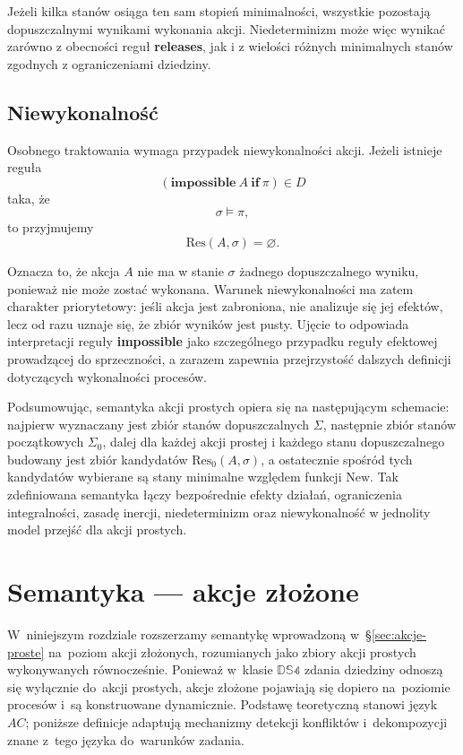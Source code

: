 \documentclass[11pt,a4paper]{article}
\newif\ifshowbib
\newcommand{\bibonly}[1]{\ifshowbib#1\fi}
\renewcommand{\cite}[2][]{\unskip}%
\theoremstyle{definition}
\begin{document}
Jeżeli kilka stanów osiąga ten sam stopień minimalności, wszystkie pozostają dopuszczalnymi wynikami wykonania akcji. Niedeterminizm może więc wynikać zarówno z obecności reguł \textbf{releases}, jak i z wielości różnych minimalnych stanów zgodnych z ograniczeniami dziedziny.

\subsection{Niewykonalność}
\label{sec:niewykonalnosc}

Osobnego traktowania wymaga przypadek niewykonalności akcji. Jeżeli istnieje reguła
\[
(\textbf{impossible}\ A\ \textbf{if}\ \pi)\in D
\]
taka, że
\[
\sigma \models \pi,
\]
to przyjmujemy
\[
\mathrm{Res}(A,\sigma)=\varnothing.
\]

Oznacza to, że akcja $A$ nie ma w stanie $\sigma$ żadnego dopuszczalnego wyniku, ponieważ nie może zostać wykonana. Warunek niewykonalności ma zatem charakter priorytetowy: jeśli akcja jest zabroniona, nie analizuje się jej efektów, lecz od razu uznaje się, że zbiór wyników jest pusty. Ujęcie to odpowiada interpretacji reguły \textbf{impossible} jako szczególnego przypadku reguły efektowej prowadzącej do sprzeczności, a zarazem zapewnia przejrzystość dalszych definicji dotyczących wykonalności procesów.

Podsumowując, semantyka akcji prostych opiera się na następującym schemacie: najpierw wyznaczany jest zbiór stanów dopuszczalnych $\Sigma$, następnie zbiór stanów początkowych $\Sigma_0$, dalej dla każdej akcji prostej i każdego stanu dopuszczalnego budowany jest zbiór kandydatów $\mathrm{Res}_0(A,\sigma)$, a ostatecznie spośród tych kandydatów wybierane są stany minimalne względem funkcji $\mathrm{New}$. Tak zdefiniowana semantyka łączy bezpośrednie efekty działań, ograniczenia integralności, zasadę inercji, niedeterminizm oraz niewykonalność w jednolity model przejść dla akcji prostych.

\section{Semantyka --- akcje złożone}
\label{sec:akcje-zlozone}

W~niniejszym rozdziale rozszerzamy semantykę wprowadzoną w~§\ref{sec:akcje-proste} na~poziom
akcji złożonych, rozumianych jako zbiory akcji prostych wykonywanych
równocześnie. Ponieważ w~klasie $\mathbb{DS4}$ zdania dziedziny
odnoszą się wyłącznie do~akcji prostych, akcje złożone pojawiają się
dopiero na~poziomie procesów i~są konstruowane dynamicznie. Podstawę
teoretyczną stanowi język~$AC$\bibonly{~\cite{rw05}}; poniższe definicje
adaptują mechanizmy detekcji konfliktów i~dekompozycji znane z~tego języka
do~warunków zadania.
\end{document}
